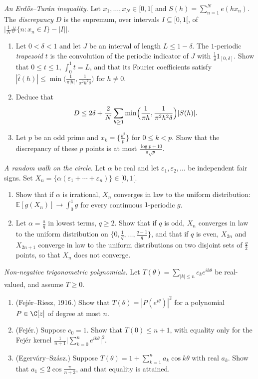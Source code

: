 \begin{exercise}[$\star\star\star$]\label{pb:erdosturan}
\emph{An Erdős--Turán inequality.} Let $x_1,\dots,x_N\in[0,1[$ and $S(h)=\sum_{n=1}^Ne(hx_n)$. The \emph{discrepancy} $D$ is the supremum, over intervals $I\subseteq[0,1[$, of $\bigl|\frac1N\#\{n:x_n\in I\}-|I|\bigr|$.
\begin{enumerate}[label=(\alph*)]
\item Let $0<\delta<1$ and let $J$ be an interval of length $L\le1-\delta$. The $1$-periodic \emph{trapezoid} $t$ is the convolution
of the periodic indicator of $J$ with $\frac1\delta1_{[0,\delta]}$. Show that $0\le t\le1$, $\int_0^1t=L$, and that its Fourier
coefficients satisfy $|\hat t(h)|\le\min\bigl(\frac1{\pi|h|},\frac1{\pi^2h^2\delta}\bigr)$ for $h\ne0$.
\item Deduce that
\[
D\le2\delta+\frac2N\sum_{h\ge1}\min\Bigl(\frac1{\pi h},\frac1{\pi^2h^2\delta}\Bigr)|S(h)|.
\]
\item Let $p$ be an odd prime and $x_k=\{\frac{k^2}p\}$ for $0\le k<p$. Show that the discrepancy of these $p$ points is at most
$\frac{\log p+10}{\pi\sqrt p}$.
\end{enumerate}
\end{exercise}

\begin{exercise}[$\star\star$]\label{pb:circlewalk}
\emph{A random walk on the circle.} Let $\alpha$ be real and let $\varepsilon_1,\varepsilon_2,\dots$ be independent fair signs. Set $X_n=\{\alpha(\varepsilon_1+\cdots+\varepsilon_n)\}\in[0,1[$.
\begin{enumerate}[label=(\alph*)]
\item Show that if $\alpha$ is irrational, $X_n$ converges in law to the uniform distribution: $\mathbb E[g(X_n)]\to\int_0^1g$ for every
continuous $1$-periodic $g$.
\item Let $\alpha=\frac aq$ in lowest terms, $q\ge2$. Show that if $q$ is odd, $X_n$ converges in law to the uniform distribution on
$\{0,\frac1q,\dots,\frac{q-1}q\}$, and that if $q$ is even, $X_{2n}$ and $X_{2n+1}$ converge in law to the uniform distributions on two
disjoint sets of $\frac q2$ points, so that $X_n$ does not converge.
\end{enumerate}
\end{exercise}

\begin{exercise}[$\star\star\star$]\label{pb:fejer}
\emph{Non-negative trigonometric polynomials.} Let $T(\theta)=\sum_{|k|\le n}c_ke^{ik\theta}$ be real-valued, and assume $T\ge0$.
\begin{enumerate}[label=(\alph*)]
\item (Fejér--Riesz, 1916.) Show that $T(\theta)=|P(e^{i\theta})|^2$ for a polynomial $P\in\C[z]$ of degree at most $n$.
\item (Fejér.) Suppose $c_0=1$. Show that $T(0)\le n+1$, with equality only for the Fejér kernel $\frac1{n+1}\bigl|\sum_{k=0}^ne^{ik\theta}\bigr|^2$.
\item (Egerváry--Szász.) Suppose $T(\theta)=1+\sum_{k=1}^na_k\cos k\theta$ with real $a_k$. Show that $a_1\le2\cos\frac\pi{n+2}$, and that equality is
attained.
\end{enumerate}
\end{exercise}

